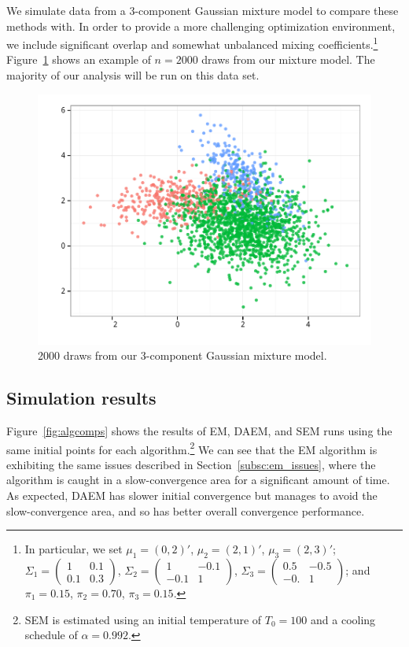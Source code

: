 \documentclass{article}
\theoremstyle{definition}
\theoremstyle{algodesc}
\begin{document}
We simulate data from a 3-component Gaussian mixture model to compare these methods with. In order to provide a more challenging optimization environment, we include significant overlap and somewhat unbalanced mixing coefficients.\footnote{In particular, we set $\mu_1 = (0, 2)'$, $\mu_2 = (2, 1)'$, $\mu_3 = (2, 3)'$; $\Sigma_1 = \begin{pmatrix} 1 & 0.1 \\ 0.1 & 0.3 \end{pmatrix}$, $\Sigma_2 = \begin{pmatrix} 1 & -0.1 \\ -0.1 & 1 \end{pmatrix}$, $\Sigma_3 = \begin{pmatrix} 0.5 & -0.5 \\ -0. & 1 \end{pmatrix}$; and $\pi_1 = 0.15$, $\pi_2 = 0.70$, $\pi_3 = 0.15$.} Figure~\ref{fig:sim_data} shows an example of $n=2000$ draws from our mixture model. The majority of our analysis will be run on this data set.

\begin{figure}[t] \centering
  \includegraphics[width=.45\linewidth]{include/sim_data.pdf}
  \caption{2000 draws from our 3-component Gaussian mixture model.}
  \label{fig:sim_data}
\end{figure}


\subsection{Simulation results}

Figure~\ref{fig:algcomps} shows the results of EM, DAEM, and SEM runs using the same initial points for each algorithm.\footnote{SEM is estimated using an initial temperature of $T_0 = 100$ and a cooling schedule of $\alpha = 0.992$.} We can see that the EM algorithm is exhibiting the same issues described in Section~\ref{subsc:em_issues}, where the algorithm is caught in a slow-convergence area for a significant amount of time. As expected, DAEM has slower initial convergence but manages to avoid the slow-convergence area, and so has better overall convergence performance.
\end{document}
